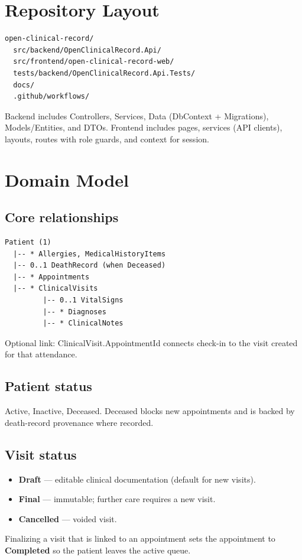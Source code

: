 \documentclass[11pt,a4paper]{article}
\begin{document}
\section{Repository Layout}

\begin{lstlisting}
open-clinical-record/
  src/backend/OpenClinicalRecord.Api/
  src/frontend/open-clinical-record-web/
  tests/backend/OpenClinicalRecord.Api.Tests/
  docs/
  .github/workflows/
\end{lstlisting}

Backend includes Controllers, Services, Data (DbContext + Migrations), Models/Entities, and DTOs. Frontend includes pages, services (API clients), layouts, routes with role guards, and context for session.

\section{Domain Model}

\subsection{Core relationships}
\begin{verbatim}
Patient (1)
  |-- * Allergies, MedicalHistoryItems
  |-- 0..1 DeathRecord (when Deceased)
  |-- * Appointments
  |-- * ClinicalVisits
         |-- 0..1 VitalSigns
         |-- * Diagnoses
         |-- * ClinicalNotes
\end{verbatim}

Optional link: ClinicalVisit.AppointmentId connects check-in to the visit created for that attendance.

\subsection{Patient status}
Active, Inactive, Deceased. Deceased blocks new appointments and is backed by death-record provenance where recorded.

\subsection{Visit status}
\begin{itemize}
  \item \textbf{Draft} --- editable clinical documentation (default for new visits).
  \item \textbf{Final} --- immutable; further care requires a new visit.
  \item \textbf{Cancelled} --- voided visit.
\end{itemize}
Finalizing a visit that is linked to an appointment sets the appointment to \textbf{Completed} so the patient leaves the active queue.
\end{document}
